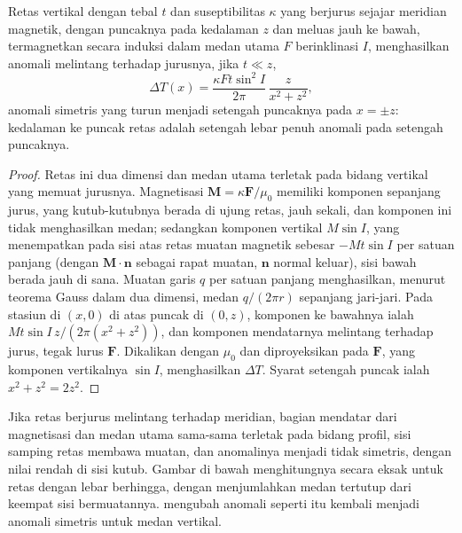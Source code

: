 \begin{proposition}\label{prop:b3:field-lab-methods-3:dyke}
Retas vertikal dengan tebal $t$ dan suseptibilitas $\kappa$ yang berjurus
sejajar meridian magnetik, dengan puncaknya pada kedalaman $z$ dan meluas jauh
ke bawah, termagnetkan secara induksi dalam medan utama $F$ berinklinasi $I$,
menghasilkan anomali melintang terhadap jurusnya, jika $t \ll z$,
\[
\Delta T(x) = \frac{\kappa F t\sin^2 I}{2\pi}\,\frac{z}{x^2 + z^2} ,
\]
anomali simetris yang turun menjadi setengah puncaknya pada $x = \pm z$:
kedalaman ke puncak retas adalah setengah lebar penuh anomali pada
setengah puncaknya.
\end{proposition}

\begin{proof}
Retas ini dua dimensi dan medan utama terletak pada bidang vertikal
yang memuat jurusnya. Magnetisasi $\mathbf{M} = \kappa\mathbf{F}/\mu_0$
memiliki komponen sepanjang jurus, yang kutub-kutubnya berada di ujung
retas, jauh sekali, dan komponen ini tidak menghasilkan medan; sedangkan komponen vertikal $M
\sin I$, yang menempatkan pada sisi atas retas muatan magnetik sebesar
$-Mt\sin I$ per satuan panjang (dengan $\mathbf{M}\cdot\mathbf{n}$ sebagai
rapat muatan, $\mathbf{n}$ normal keluar), sisi bawah berada
jauh di sana. Muatan garis $q$ per satuan panjang menghasilkan, menurut
teorema Gauss dalam dua dimensi, medan $q/(2\pi r)$ sepanjang jari-jari. Pada
stasiun di $(x, 0)$ di atas puncak di $(0, z)$, komponen ke bawahnya
ialah $Mt\sin I\,z/(2\pi(x^2 + z^2))$, dan komponen mendatarnya
melintang terhadap jurus, tegak lurus $\mathbf{F}$. Dikalikan dengan
$\mu_0$ dan diproyeksikan pada $\mathbf{F}$, yang komponen vertikalnya
$\sin I$, menghasilkan $\Delta T$. Syarat setengah puncak ialah $x^2 + z^2 =
2z^2$.
\end{proof}

Jika retas berjurus melintang terhadap meridian, bagian mendatar dari
magnetisasi dan medan utama sama-sama terletak pada bidang
profil, sisi samping retas membawa muatan, dan anomalinya menjadi
tidak simetris, dengan nilai rendah di sisi kutub. Gambar di bawah
menghitungnya secara eksak untuk retas dengan lebar berhingga, dengan menjumlahkan medan tertutup
dari keempat sisi bermuatannya.  mengubah anomali seperti itu
kembali menjadi anomali simetris untuk medan vertikal.

